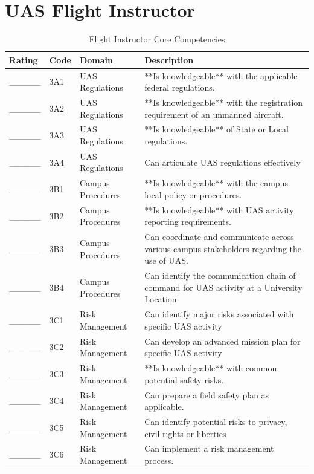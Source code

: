 \documentclass[
]{book}
\begin{document}
\hypertarget{uas-flight-instructor}{%
\section{UAS Flight Instructor}\label{uas-flight-instructor}}

\begin{longtable}[t]{lll>{\raggedright\arraybackslash}p{25em}}
\caption{\label{tab:unnamed-chunk-10}Flight Instructor Core Competencies}\\
\toprule
Rating & Code & Domain & Description\\
\midrule
\_\_\_\_\_ & 3A1 & UAS Regulations & **Is knowledgeable** with the applicable federal regulations.\\
\_\_\_\_\_ & 3A2 & UAS Regulations & **Is knowledgeable** with the registration requirement of an unmanned aircraft.\\
\_\_\_\_\_ & 3A3 & UAS Regulations & **Is knowledgeable** of State or Local regulations.\\
\_\_\_\_\_ & 3A4 & UAS Regulations & Can articulate UAS regulations effectively\\
\_\_\_\_\_ & 3B1 & Campus Procedures & **Is knowledgeable** with the campus local policy or procedures.\\
\addlinespace
\_\_\_\_\_ & 3B2 & Campus Procedures & **Is knowledgeable** with UAS activity reporting requirements.\\
\_\_\_\_\_ & 3B3 & Campus Procedures & Can coordinate and communicate across various campus stakeholders regarding the use of UAS.\\
\_\_\_\_\_ & 3B4 & Campus Procedures & Can identify the communication chain of command for UAS activity at a University Location\\
\_\_\_\_\_ & 3C1 & Risk Management & Can identify major risks associated with specific UAS activity\\
\_\_\_\_\_ & 3C2 & Risk Management & Can develop an advanced mission plan for specific UAS activity\\
\addlinespace
\_\_\_\_\_ & 3C3 & Risk Management & **Is knowledgeable** with common potential safety risks.\\
\_\_\_\_\_ & 3C4 & Risk Management & Can prepare a field safety plan as applicable.\\
\_\_\_\_\_ & 3C5 & Risk Management & Can identify potential risks to privacy, civil rights or liberties\\
\_\_\_\_\_ & 3C6 & Risk Management & Can implement a risk management process.\\

\end{longtable}
\end{document}
